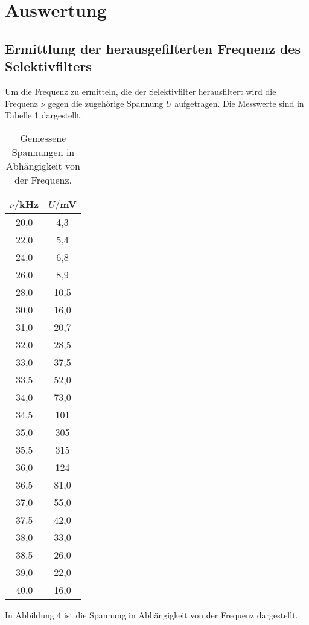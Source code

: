 \section{Auswertung}
\label{sec:Auswertung}
\subsection{Ermittlung der herausgefilterten Frequenz des Selektivfilters}
Um die Frequenz zu ermitteln, die der Selektivfilter herausfiltert wird die Frequenz $\nu$ gegen
die zugehörige Spannung $U$ aufgetragen. Die Messwerte sind in Tabelle 1 dargestellt.

\begin{table}[H]
  \centering
  \caption{Gemessene Spannungen in Abhängigkeit von der Frequenz.}
  \label{tab:Rechteckspannung}
  \begin{tabular}{c c}
    \toprule
    $\nu/$kHz & $U/$mV \\
    \midrule
    20,0 &       4,3 \\
    22,0 &       5,4 \\
    24,0 &       6,8 \\
    26,0 &       8,9 \\
    28,0 &      10,5 \\
    30,0 &      16,0 \\
    31,0 &      20,7 \\
    32,0 &      28,5 \\
    33,0 &      37,5 \\
    33,5 &      52,0 \\
    34,0 &      73,0 \\
    34,5 &       101 \\
    35,0 &       305 \\
    35,5 &       315 \\
    36,0 &       124 \\
    36,5 &      81,0 \\
    37,0 &      55,0 \\
    37,5 &      42,0 \\
    38,0 &      33,0 \\
    38,5 &      26,0 \\
    39,0 &      22,0 \\
    40,0 &      16,0 \\
    \bottomrule
  \end{tabular}
\end{table}

In Abbildung 4 ist die Spannung in Abhängigkeit von der Frequenz dargestellt.

